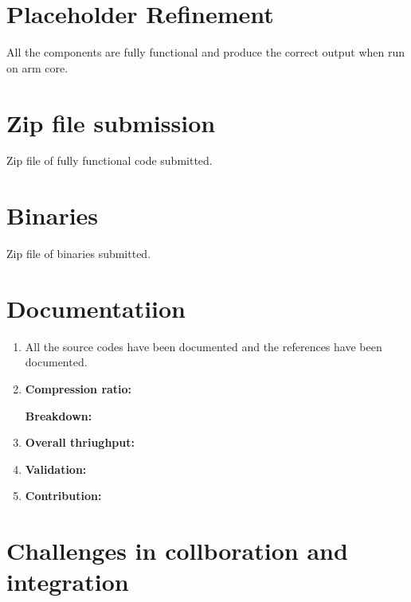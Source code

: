 \documentclass{article}
\begin{document}
\begin{enumerate}
\begin{enumerate}
\section{Placeholder Refinement}
All the components are fully functional and produce the correct output when run on arm core. 

\section{Zip file submission}
Zip file of fully functional code submitted.

\section{Binaries}
Zip file of binaries submitted.

\section{Documentatiion}

\begin{enumerate}
\item%

All the source codes have been documented and the references have been documented. 

\item%

\textbf{Compression ratio:}

\textbf{Breakdown:}

\item%

\textbf{Overall thriughput:}

\item%

\textbf{Validation:}

\item%


\textbf{Contribution:}

\end{enumerate}

\section{Challenges in collboration and integration}

\end{enumerate}

\end{enumerate}
\end{document}
